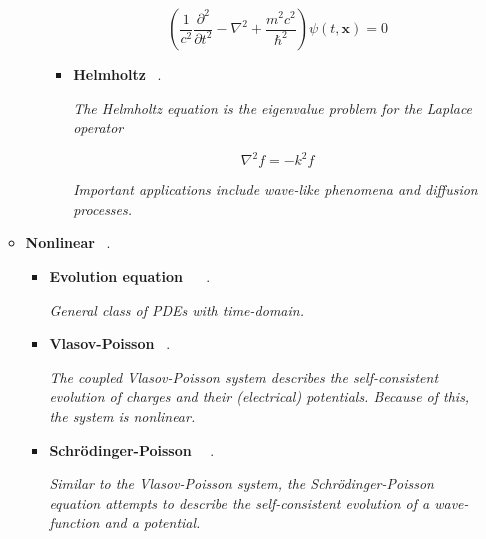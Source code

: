 \documentclass[12pt,letterpaper]{article}
\begin{document}
\begin{itemize}
\begin{itemize}
\begin{itemize}
\begin{itemize}
                            $$
                                \left(\frac{1}{c^2} \frac{\partial^2}{\partial t^2}-\nabla^2+\frac{m^2 c^2}{\hbar^2}\right) \psi(t, \mathbf{x})=0
                            $$
                           
                           \item \textbf{Helmholtz}   ~\cite{eweVariationalQuantumBasedSimulation2022}.

                            \textit{The Helmholtz equation is the eigenvalue problem for the Laplace operator}
                            
                           $$ \nabla^2 f = - k^2 f$$
                           
                           \textit{Important applications include wave-like phenomena and diffusion processes.}
                           
                         \end{itemize}  

				\end{itemize}

            \item \textbf{Nonlinear}  ~\cite{jinQuantumAlgorithmsComputing2022,linKoopmanNeumannMechanics2022}.
            
            \begin{itemize} 
            
    			    \item \textbf{Evolution equation} ~ ~\cite{leongVariationalQuantumEvolution2022}.
                
                    \textit{General class of PDEs with time-domain.}
            
					\item \textbf{Vlasov-Poisson}  ~\cite{yeQuantuminspiredMethodSolving2022}. 

                    \textit{The coupled Vlasov-Poisson system describes the self-consistent evolution of charges and their (electrical) potentials. Because of this, the system is nonlinear. }
                    
                    \item \textbf{Schrödinger-Poisson} ~~\cite{moczCosmologicalSimulationsDark2021}.

                    \textit{Similar to the Vlasov-Poisson system, the Schrödinger-Poisson equation attempts to describe the self-consistent evolution of a wave-function and a potential.}


\end{itemize}
\end{itemize}
\end{itemize}
\end{document}

